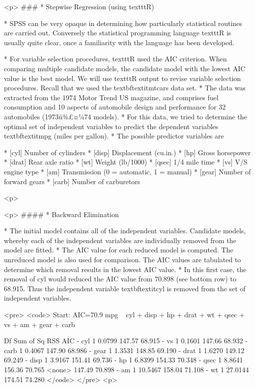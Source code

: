 
<p>
###        * {Stepwise Regression (using texttt{R})}

*  SPSS can be very opaque in determining how particularly statistical routines are carried out. Conversely the statistical programming language texttt{R} is usually quite clear, once a familiarity with the language has been developed.
	
*  For variable selection procedures, texttt{R} used the AIC criterion. When comparing multiple candidate models, the candidate model with the lowest AIC value is the best model. We will use texttt{R} output to revise variable selection procedures. Recall that we used the textbf{textit{mtcars}} data set. 
*  The data was extracted from the 1974 Motor Trend US magazine, and comprises fuel consumption and 10 aspects of automobile design and performance for 32 automobiles (1973ü¾£¤¼74 models). 
*  For this data, we tried to determine the optimal set of independent variables to predict the dependent variables textbf{textit{mpg}} (miles per gallon).
*  The possible predictor variables are
	 
*  [cyl]  Number of cylinders
*  [disp]	 Displacement (cu.in.)
*  [hp]  Gross horsepower
*  [drat]	 Rear axle ratio
*  [wt] Weight (lb/1000)
*  [qsec]	 1/4 mile time
*  [vs] V/S engine type
*  [am] Transmission (0 = automatic, 1 = manual)
*  [gear]	 Number of forward gears
*  [carb]	  Number of carburetors
	

<p>




<p>
####        * {Backward Elimination}

* The initial model contains all of the independent variables. Candidate models, whereby each of the independent variables are individually removed from the model are fitted.
* The AIC value for each reduced model is computed. The unreduced model is also used for comparison. The AIC values are tabulated to determine which removal results in the lowest AIC value. 
* In this first case, the removal of cyl would reduced the AIC value from 70.898 (see bottom row) to 68.915. Thus the independent variable textbf{textit{cyl}} is removed from the set of independent variables.


<pre>
<code>
Start:  AIC=70.9
mpg ~ cyl + disp + hp + drat + wt + qsec + vs + am + gear + carb

       Df Sum of Sq    RSS    AIC
- cyl   1    0.0799 147.57 68.915
- vs    1    0.1601 147.66 68.932
- carb  1    0.4067 147.90 68.986
- gear  1    1.3531 148.85 69.190
- drat  1    1.6270 149.12 69.249
- disp  1    3.9167 151.41 69.736
- hp    1    6.8399 154.33 70.348
- qsec  1    8.8641 156.36 70.765
<none>              147.49 70.898
- am    1   10.5467 158.04 71.108
- wt    1   27.0144 174.51 74.280
</code>
</pre>
<p>

